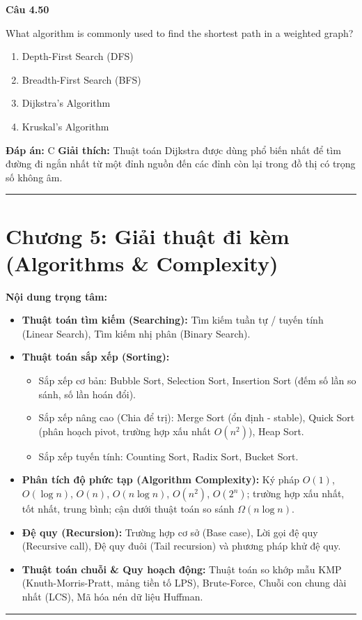 \documentclass[11pt,a4paper]{article}
\newenvironment{question}[1]{%
  \par\vspace{1em}\noindent\textbf{\large Câu #1}\par\vspace{0.4em}
}{%
  \par\vspace{1em}\hrule\vspace{0.6em}
}
\newenvironment{choices}{%
  \begin{enumerate}[label=\textbf{\Alph*.},leftmargin=2.2em,itemsep=2pt,topsep=3pt]
}{%
  \end{enumerate}
}
\newcommand{\choice}{\item}
\begin{document}
\begin{question}{4.50}
What algorithm is commonly used to find the shortest path in a weighted graph?
\begin{choices}
\choice Depth-First Search (DFS)
\choice Breadth-First Search (BFS)
\choice Dijkstra's Algorithm
\choice Kruskal's Algorithm
\end{choices}
\textbf{Đáp án:} C
\textbf{Giải thích:} Thuật toán Dijkstra được dùng phổ biến nhất để tìm đường đi ngắn nhất từ một đỉnh nguồn đến các đỉnh còn lại trong đồ thị có trọng số không âm.
\end{question}

\newpage
\section*{Chương 5: Giải thuật đi kèm (Algorithms \& Complexity)}

\noindent\textbf{Nội dung trọng tâm:}
\begin{itemize}[noitemsep,topsep=3pt]
  \item \textbf{Thuật toán tìm kiếm (Searching):} Tìm kiếm tuần tự / tuyến tính (Linear Search), Tìm kiếm nhị phân (Binary Search).
  \item \textbf{Thuật toán sắp xếp (Sorting):}
    \begin{itemize}[noitemsep]
      \item Sắp xếp cơ bản: Bubble Sort, Selection Sort, Insertion Sort (đếm số lần so sánh, số lần hoán đổi).
      \item Sắp xếp nâng cao (Chia để trị): Merge Sort (ổn định - stable), Quick Sort (phân hoạch pivot, trường hợp xấu nhất $O(n^2)$), Heap Sort.
      \item Sắp xếp tuyến tính: Counting Sort, Radix Sort, Bucket Sort.
    \end{itemize}
  \item \textbf{Phân tích độ phức tạp (Algorithm Complexity):} Ký pháp $O(1)$, $O(\log n)$, $O(n)$, $O(n \log n)$, $O(n^2)$, $O(2^n)$; trường hợp xấu nhất, tốt nhất, trung bình; cận dưới thuật toán so sánh $\Omega(n \log n)$.
  \item \textbf{Đệ quy (Recursion):} Trường hợp cơ sở (Base case), Lời gọi đệ quy (Recursive call), Đệ quy đuôi (Tail recursion) và phương pháp khử đệ quy.
  \item \textbf{Thuật toán chuỗi \& Quy hoạch động:} Thuật toán so khớp mẫu KMP (Knuth-Morris-Pratt, mảng tiền tố LPS), Brute-Force, Chuỗi con chung dài nhất (LCS), Mã hóa nén dữ liệu Huffman.
\end{itemize}
\bigskip
\hrule
\bigskip
\end{document}
